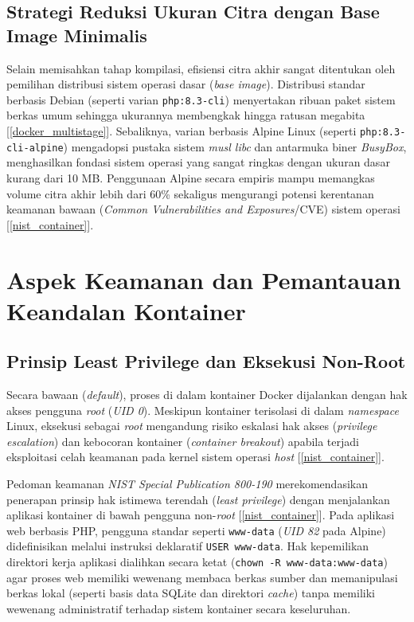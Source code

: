 \subsection{Strategi Reduksi Ukuran Citra dengan Base Image Minimalis}
Selain memisahkan tahap kompilasi, efisiensi citra akhir sangat ditentukan oleh pemilihan distribusi sistem operasi dasar (\textit{base image}). Distribusi standar berbasis Debian (seperti varian \texttt{php:8.3-cli}) menyertakan ribuan paket sistem berkas umum sehingga ukurannya membengkak hingga ratusan megabita [\ref{docker_multistage}]. Sebaliknya, varian berbasis Alpine Linux (seperti \texttt{php:8.3-cli-alpine}) mengadopsi pustaka sistem \textit{musl libc} dan antarmuka biner \textit{BusyBox}, menghasilkan fondasi sistem operasi yang sangat ringkas dengan ukuran dasar kurang dari 10 MB. Penggunaan Alpine secara empiris mampu memangkas volume citra akhir lebih dari 60\% sekaligus mengurangi potensi kerentanan keamanan bawaan (\textit{Common Vulnerabilities and Exposures}/CVE) sistem operasi [\ref{nist_container}].

\clearpage
\section{Aspek Keamanan dan Pemantauan Keandalan Kontainer}

\subsection{Prinsip Least Privilege dan Eksekusi Non-Root}
Secara bawaan (\textit{default}), proses di dalam kontainer Docker dijalankan dengan hak akses pengguna \textit{root} (\textit{UID 0}). Meskipun kontainer terisolasi di dalam \textit{namespace} Linux, eksekusi sebagai \textit{root} mengandung risiko eskalasi hak akses (\textit{privilege escalation}) dan kebocoran kontainer (\textit{container breakout}) apabila terjadi eksploitasi celah keamanan pada kernel sistem operasi \textit{host} [\ref{nist_container}].

Pedoman keamanan \textit{NIST Special Publication 800-190} merekomendasikan penerapan prinsip hak istimewa terendah (\textit{least privilege}) dengan menjalankan aplikasi kontainer di bawah pengguna non-\textit{root} [\ref{nist_container}]. Pada aplikasi web berbasis PHP, pengguna standar seperti \texttt{www-data} (\textit{UID 82} pada Alpine) didefinisikan melalui instruksi deklaratif \texttt{USER www-data}. Hak kepemilikan direktori kerja aplikasi dialihkan secara ketat (\texttt{chown -R www-data:www-data}) agar proses web memiliki wewenang membaca berkas sumber dan memanipulasi berkas lokal (seperti basis data SQLite dan direktori \textit{cache}) tanpa memiliki wewenang administratif terhadap sistem kontainer secara keseluruhan.

